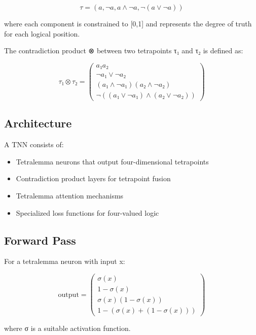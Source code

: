 \documentclass[10pt,journal,compsoc]{IEEEtran}
\begin{document}
\begin{equation}
\tau = (a, \neg a, a \wedge \neg a, \neg(a \vee \neg a))
\end{equation}

where each component is constrained to [0,1] and represents the degree of truth for each logical position.

The contradiction product ⊗ between two tetrapoints τ₁ and τ₂ is defined as:

\begin{equation}
\tau₁ ⊗ \tau₂ = \begin{pmatrix}
a₁a₂ \\
\neg a₁ \vee \neg a₂ \\
(a₁ \wedge \neg a₁)(a₂ \wedge \neg a₂) \\
\neg((a₁ \vee \neg a₁) \wedge (a₂ \vee \neg a₂))
\end{pmatrix}
\end{equation}

\subsection{Architecture}
A TNN consists of:

\begin{itemize}
\item Tetralemma neurons that output four-dimensional tetrapoints
\item Contradiction product layers for tetrapoint fusion
\item Tetralemma attention mechanisms
\item Specialized loss functions for four-valued logic
\end{itemize}

\subsection{Forward Pass}
For a tetralemma neuron with input x:

\begin{equation}
\text{output} = \begin{pmatrix}
\sigma(x) \\
1 - \sigma(x) \\
\sigma(x)(1-\sigma(x)) \\
1 - (\sigma(x) + (1-\sigma(x)))
\end{pmatrix}
\end{equation}

where σ is a suitable activation function.
\end{document}
